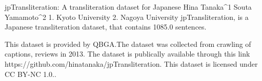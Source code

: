 
jpTransliteration: A transliteration dataset for Japanese
Hina Tanaka^1 Souta Yamamoto^2
1. Kyoto University 2. Nagoya University
jpTransliteration, is a Japanese transliteration dataset, that contains 1085.0 sentences.

This dataset is provided by QBGA.The dataset was collected from crawling of captions, reviews in 2013. 
The dataset is publically available through this link https://github.com/hinatanaka/jpTransliteration. This dataset is licensed under CC BY-NC 1.0..

